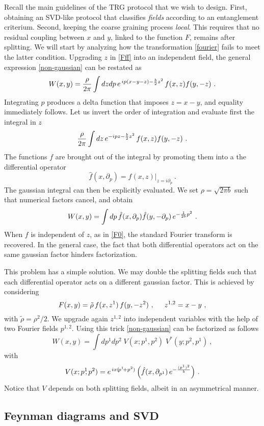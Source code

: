\documentclass[a4paper,preprintnumbers,nofootinbib,twocolumn]{quantumarticle}
\newcommand{\be}{\begin{equation}} \newcommand{\ee}{\end{equation}}
\begin{document}
Recall the main guidelines of the TRG protocol that we wish to design.
First, obtaining an SVD-like protocol that classifies {\it fields} 
according to an entanglement criterium. Second, keeping the coarse graining process {\it local}. This requires that no residual coupling between $x$ and $y$,
linked to the function $F$, remains after splitting. We will start by analyzing how the transformation \eqref{fourier} fails to meet the latter condition. 
Upgrading $z$ in \eqref{Fff} into an independent field, the general expression \eqref{non-gaussian} can be restated as
\be
W(x,y) =
{\rho \over 2 \pi} \int  dz  d p \, e^{\,  i p(x-y-z)-{b \over 2} z^2} \, f(x,z)f(y,-z) \ .
\label{zint}
\ee
Integrating $p$ produces a delta function that imposes $z=x-y$, and equality immediately follows. Let us invert the order of integration and
evaluate first the integral in $z$
\be
{\rho \over 2 \pi} \int  dz  \, e^{ - i pz-{b \over 2} z^2} \, f(x,z)f(y,-z) \ .
\ee
The functions $f$ are brought out of the integral by promoting them into a the differential operator
\be
{\hat f}(x,\partial_p) = f(x,z)|_{z=i \partial_p} \ .
\label{diff}
\ee
The gaussian integral can then be explicitly evaluated. We set $\rho\!=\!\sqrt{2 \pi b}$ such that numerical factors cancel, and obtain
\be
W(x,y) =
\int  dp  \, {\hat f}(x,\partial_p){\hat f}(y,-\partial_p) \, e^{-{1 \over 2b} p^2} \ .
\ee
When $f$ is independent of $z$, as in \eqref{F0}, 
the standard Fourier transform is recovered. In the general case, the fact that both differential operators act on the same gaussian factor hinders factorization.

This problem has a simple solution. We may double the splitting fields such that each differential operator acts on a different gaussian factor.
This is achieved by considering
\be
F(x,y)={\tilde \rho}
\,f(x,z^1)\, f(y,-z^2) \ , \hspace{5mm} z^{1,2}=x-y \ ,
\label{Fff12}
\ee
with ${\tilde \rho}=\rho^2/2$.
We upgrade again $z^{1,2}$ into independent variables with the help of two Fourier fields $p^{1,2}$.
Using this trick \eqref{non-gaussian} can be factorized as follows
\be
W(x,y) =
\int \!\! d\!p^1\! d\! p^2 \; V(x;p^1\!\!,p^2) \;V^\ast(y;p^2\!\!,p^1)  \ ,
\ee
\vspace*{-4mm}
\noindent with
\be
V(x;p^1\!\!,p^2) = e^{\, ix(\!p^1\!+p^2) } \,  \Big( {\hat f}(x,{\partial}_{p^1})  \, e^{-{(p^1)^2 \over b}} \Big) \ .
\label{Vsplit}
\ee
Notice that $V$ depends on both splitting fields, albeit in an asymmetrical manner. 

\subsection{Feynman diagrams and SVD}
\end{document}
